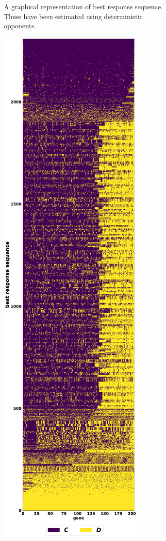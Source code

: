 \begin{figure}[!htbp]
\begin{subfigure}{0.45\textwidth}
    \caption{A graphical representation of best \deterministicsequences response sequence. These
    have been estimated using deterministic opponents.}\label{fig:brs_visualisation}
    \end{subfigure}\hfill
    \begin{subfigure}{0.45\textwidth}
    \centering
    \includegraphics[width=.9\textwidth]{src/chapters/06/img/stochastic_best_responses.pdf}

\end{subfigure}
\end{figure}
